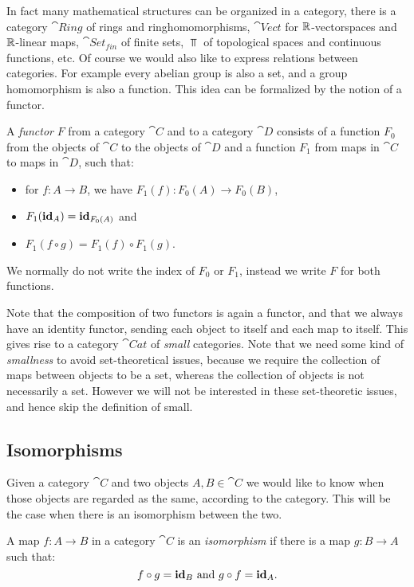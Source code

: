 In fact many mathematical structures can be organized in a category, there is a category $\cat{Ring}$ of rings and ringhomomorphisms, $\cat{Vect}$ for $\mathbb{R}$-vectorspaces and $\mathbb{R}$-linear maps, $\cat{Set_{fin}}$ of finite sets, $\Top$ of topological spaces and continuous functions, etc. Of course we would also like to express relations between categories. For example every abelian group is also a set, and a group homomorphism is also a function. This idea can be formalized by the notion of a functor.

\begin{definition}
	A \emph{functor} $F$ from a category $\cat{C}$ and to a category $\cat{D}$ consists of a function $F_0$ from the objects of $\cat{C}$ to the objects of $\cat{D}$ and a function $F_1$ from maps in $\cat{C}$ to maps in $\cat{D}$, such that:
	\begin{itemize}
		\item for $f: A \to B$, we have $F_1(f): F_0(A) \to F_0(B)$,
		\item $F_1(\mathbf{id}_A) = \mathbf{id}_{F_0(A)}$ and
		\item $F_1(f \circ g) = F_1(f) \circ F_1(g)$.
	\end{itemize}
	We normally do not write the index of $F_0$ or $F_1$, instead we write $F$ for both functions.
\end{definition}

Note that the composition of two functors is again a functor, and that we always have an identity functor, sending each object to itself and each map to itself. This gives rise to a category $\cat{Cat}$ of \emph{small} categories. Note that we need some kind of \emph{smallness} to avoid set-theoretical issues, because we require the collection of maps between objects to be a set, whereas the collection of objects is not necessarily a set. However we will not be interested in these set-theoretic issues, and hence skip the definition of small.

\subsection{Isomorphisms}
Given a category $\cat{C}$ and two objects $A, B \in \cat{C}$ we would like to know when those objects are regarded as the same, according to the category. This will be the case when there is an isomorphism between the two.

\begin{definition}
	A map $f: A \to B$ in a category $\cat{C}$ is an \emph{isomorphism} if there is a map $g: B \to A$ such that:
	$$ f \circ g = \mathbf{id}_B \text{ and } g \circ f = \mathbf{id}_A.$$
\end{definition}

